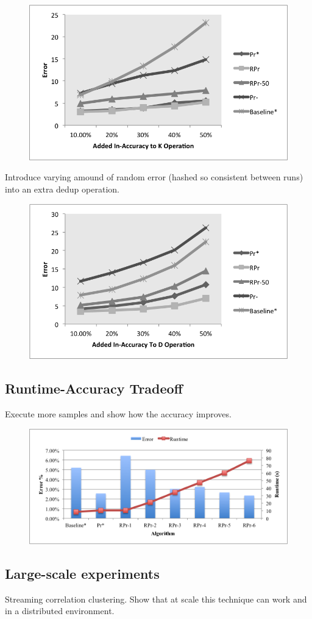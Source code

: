 \begin{figure}[ht]
\centering
\includegraphics[scale=0.5]{fig2.png}
\caption{}
\label{exp:ms-academic-ranking}
\end{figure}

Introduce varying amound of random error (hashed so consistent between runs) into an extra dedup operation.

\begin{figure}[ht]
\centering
\includegraphics[scale=0.5]{fig3.png}
\caption{}
\label{exp:ms-academic-ranking}
\end{figure}

\subsection{Runtime-Accuracy Tradeoff}
Execute more samples and show how the accuracy improves.

\begin{figure}[ht]
\centering
\includegraphics[scale=0.5]{fig4.png}
\caption{}
\label{exp:ms-academic-ranking}
\end{figure}


\subsection{Large-scale experiments}
Streaming correlation clustering. Show that at scale this technique can work and in a distributed environment.


